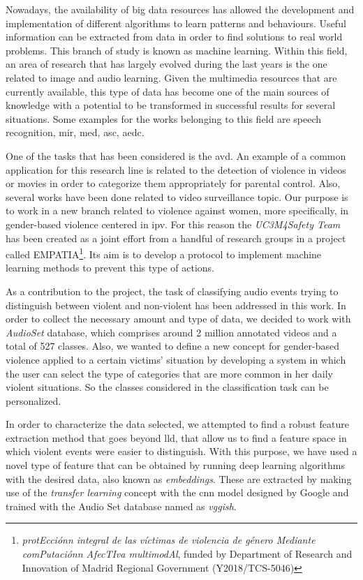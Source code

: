 	Nowadays, the availability of big data resources has allowed the development and implementation of different algorithms to learn patterns and behaviours. Useful information can be extracted from data in order to find solutions to real world problems. This branch of study is known as machine learning. Within this field, an area of research that has largely evolved during the last years is the one related to image and audio learning. Given the multimedia resources that are currently available, this type of data has become one of the main sources of knowledge with a potential to be transformed in successful results for several situations. Some examples for the works belonging to this field are speech recognition, \acrfull{mir}, \acrfull{med}, \acrfull{asc}, \acrfull{aedc}.
	
	One of the tasks that has been considered is the \acrfull{avd}. An example of a common application for this research line is related to the detection of violence in videos or movies in order to categorize them appropriately for parental control. Also, several works have been done related to video surveillance topic. Our purpose is to work in a new branch related to violence against women, more specifically, in gender-based violence centered in \acrfull{ipv}. For this reason the \textit{UC3M4Safety Team} has been created as a joint effort from a handful of research groups in a project called EMPATIA\footnote{\textit{protEcciónn integral de las víctimas de violencia de género Mediante comPutaciónn AfecTIva multimodAl}, funded by Department  of  Research  and Innovation of Madrid Regional Government (Y2018/TCS-5046)}. Its aim is %
	to develop a protocol to implement machine learning methods to prevent this type of actions. 
	
	As a contribution to the project, the task of classifying audio events trying to distinguish between violent and non-violent has been addressed in this work. In order to collect the necessary amount and type of data, we decided to work with \textit{AudioSet} database, which comprises around 2 million annotated videos and a total of 527 classes. Also, we wanted to define a new concept for gender-based violence applied to a certain victims' situation by developing a system in which the user can select the type of categories that are more common in her daily violent situations. So the classes considered in the classification task can be personalized. 
	
	In order to characterize the data selected, we attempted to find a robust feature extraction method that goes beyond \acrfull{lld}, that allow us to find a feature space in which violent events were easier to distinguish. With this purpose, we have used a novel type of feature that can be obtained by running deep learning algorithms with the desired data, also known as \textit{embeddings}. These are extracted by making use of the \textit{transfer learning} concept with the \acrshort{cnn} model designed by Google and trained with the Audio Set database named as \textit{\acrshort{vgg}ish}.
	
